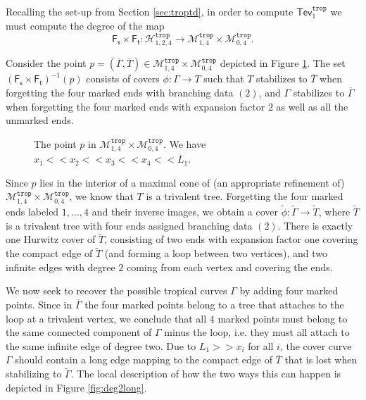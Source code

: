 \documentclass[11pt,reqno]{amsart}
\newcommand{\inputTikZ}[2]{%
     \resizebox{#1}{!}{}}
\theoremstyle{definition}
\newcommand\trop{{\mathtt{trop}}}
\newcommand\Mgn[1]{\mathcal M_{#1}}
\newcommand\Hur[1]{\mathcal H_{#1}}
\newcommand{\Ft}{\mathsf{F_t}}
\newcommand{\Fs}{\mathsf{F_s}}
\newcommand{\Tev}{{\mathsf{Tev}}}
\begin{document}
Recalling the set-up from Section \ref{sec:troptd}, in order to compute $\Tev_1^\trop$ we must compute the degree of the map
\begin{equation}
    \Fs\times \Ft: \Hur{1,2,4}^\trop \to \Mgn{1,4}^\trop \times \Mgn{0,4}^\trop.
\end{equation}

Consider the point $p = (\overline{\Gamma}, \overline{T})\in \Mgn{1,4}^\trop \times \Mgn{0,4}^\trop$ depicted in Figure \ref{fig:pgen1}. The set $(\Fs\times \Ft)^{-1}(p)$ consists of covers $\phi: \Gamma\to T$ such that $T$ stabilizes to 
$\overline{T}$ when forgetting  the four marked ends with branching data $(2)$,  and $\Gamma$ stabilizes to $\overline\Gamma$ when forgetting the four marked ends with expansion factor $2$ as well as all the unmarked ends.

\begin{figure}[b]
    \centering
\inputTikZ{\textwidth}{Figures/genusonesourceandtarget}
    \caption{The point $p$ in $\Mgn{1,4}^\trop \times \Mgn{0,4}^\trop$. We have $x_1<<x_2<<x_3<<x_4<<L_1$.}
    \label{fig:pgen1}
\end{figure}

Since $p$ lies in the interior of a maximal cone of (an appropriate refinement of) $\Mgn{1,4}^\trop \times \Mgn{0,4}^\trop$, we know that $T$ is a trivalent tree. Forgetting the four marked ends labeled $1, \ldots, 4$ and their inverse images, we obtain a cover $\tilde{\phi}: \tilde{\Gamma}\to \tilde{T}$, where $\tilde{T}$ is a trivalent tree with four ends assigned branching data $(2)$. There is exactly one Hurwitz cover of $\tilde{T}$,  consisting of two ends with expansion factor one covering the compact edge of $\tilde{T}$ (and forming  a loop between two vertices),  and two infinite edges with degree $2$ coming from each vertex and covering the ends.

We now seek to recover the possible tropical curves $\Gamma$ by adding four marked points.
Since in $\overline\Gamma$ the four marked points belong to a tree that attaches to the loop at a trivalent vertex, we conclude that all $4$ marked points must belong to the same connected component of $\Gamma$ minus the loop, i.e. they must all attach to the same infinite edge of degree two. Due to $L_1>>x_i$ for all $i$, the cover curve $\Gamma$ should contain a long edge mapping to the compact edge of $\overline{T}$ that is lost when stabilizing to $\tilde{\Gamma}$.
The local description of how the two ways this can happen is depicted in Figure \ref{fig:deg2long}. 
\end{document}
